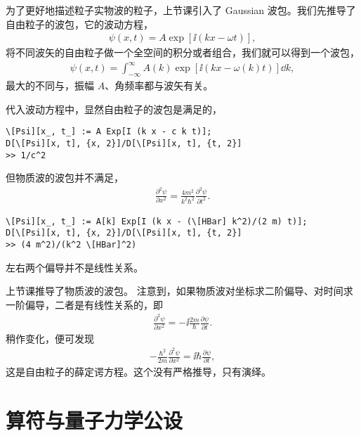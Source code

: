 为了更好地描述粒子实物波的粒子，上节课引入了 Gaussian 波包。我们先推导了自由粒子的波包，它的波动方程，
\begin{eqnarray}
    \psi(x,t) = A \exp[\ii (kx - \omega t)],
\end{eqnarray}
将不同波矢的自由粒子做一个全空间的积分或者组合，我们就可以得到一个波包，
\begin{eqnarray}
    \psi(x,t) = \int_{-\infty}^{\infty} A(k) \exp[\ii (k x - \omega(k) t)] \dd k,
\end{eqnarray}
最大的不同与，振幅 $A$、角频率都与波矢有关。

代入波动方程中，显然自由粒子的波包是满足的，
\begin{lstlisting}
\[Psi][x_, t_] := A Exp[I (k x - c k t)];
D[\[Psi][x, t], {x, 2}]/D[\[Psi][x, t], {t, 2}]
>> 1/c^2
\end{lstlisting}
但物质波的波包并不满足，
\begin{eqnarray}
    \frac{\partial^2 \psi}{\partial x^2} = \frac{4 m^2}{k^2 \hbar^2} \frac{\partial^2 \psi}{\partial t^2}. 
\end{eqnarray}
\begin{lstlisting}
\[Psi][x_, t_] := A[k] Exp[I (k x - (\[HBar] k^2)/(2 m) t)];
D[\[Psi][x, t], {x, 2}]/D[\[Psi][x, t], {t, 2}]
>> (4 m^2)/(k^2 \[HBar]^2)
\end{lstlisting}
左右两个偏导并不是线性关系。

上节课推导了物质波的波包。
注意到，如果物质波对坐标求二阶偏导、对时间求一阶偏导，二者是有线性关系的，即
\begin{eqnarray}
    \frac{\partial^2 \psi}{\partial x^2} = - \ii\frac{2m}\hbar \frac{\partial \psi}{\partial t}. 
\end{eqnarray}
稍作变化，便可发现
\begin{eqnarray}
    -\frac{\hbar^2}{2m} \frac{\partial^2 \psi}{\partial x^2} = \ii\hbar \frac{\partial\psi}{\partial t},
    \label{eq:free_partial_schrodinger}
\end{eqnarray}
这是自由粒子的薛定谔方程。这个没有严格推导，只有演绎。

\chapter{算符与量子力学公设}
